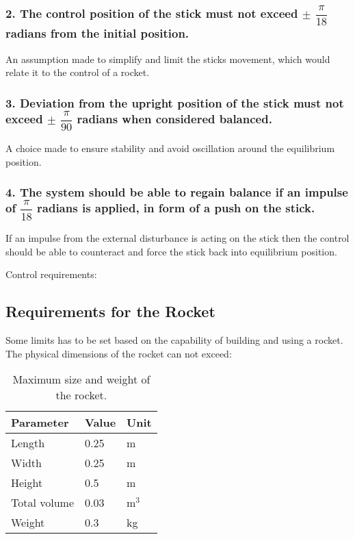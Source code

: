 \subsubsection*{2. The control position of the stick must not exceed $\pm$ $\dfrac{\pi}{18}$ radians from the initial position.}
\forceindent An assumption made to simplify and limit the sticks movement, which would relate it to the control of a rocket.
\subsubsection*{3. Deviation from the upright position of the stick must not exceed $\pm$  $\dfrac{\pi}{90}$ radians when considered balanced.}
\forceindent A choice made to ensure stability and avoid oscillation around the equilibrium position.

\subsubsection*{4. The system should be able to regain balance if an impulse of $\dfrac{\pi}{18}$ radians is applied, in form of a push on the stick.} 
\forceindent If an impulse from the external disturbance is acting on the stick then the control should be able to counteract and force the stick back into equilibrium position. 


Control requirements:



\subsection{Requirements for the Rocket}
Some limits has to be set based on the capability of building and using a rocket.  
The physical dimensions of the rocket can not exceed:
\begin{table}[htbp]
\centering
\begin{tabular}{lll}
\hline
Parameter    & Value & Unit  \\ \hline
Length       & 0.25  & m     \\
Width        & 0.25  & m     \\
Height       & 0.5   & m     \\
Total volume & 0.03  & m$^3$ \\
Weight       & 0.3   & kg   
\end{tabular}
\caption{Maximum size and weight of the rocket.}
\label{RocketDimensions}
\end{table}



